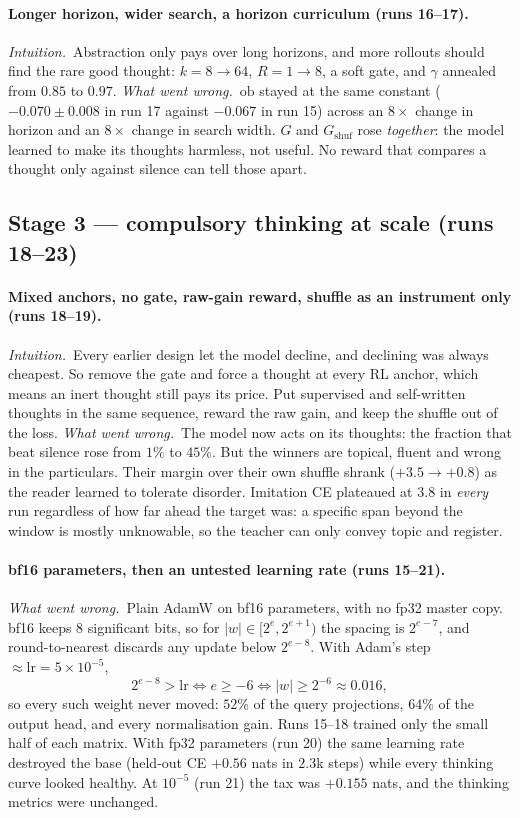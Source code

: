 \documentclass[11pt]{article}
\newcommand{\why}{\emph{Intuition.}\ }
\newcommand{\fail}{\emph{What went wrong.}\ }
\begin{document}
\paragraph{Longer horizon, wider search, a horizon curriculum (runs 16--17).}
\why Abstraction only pays over long horizons, and more rollouts should find the rare good thought: $k=8\to64$, $R=1\to8$, a soft gate, and $\gamma$ annealed from $0.85$ to $0.97$.
\fail $\mathrm{ob}$ stayed at the same constant ($-0.070\pm0.008$ in run 17 against $-0.067$ in run 15) across an $8\times$ change in horizon and an $8\times$ change in search width. $G$ and $G_{\mathrm{shuf}}$ rose \emph{together}: the model learned to make its thoughts harmless, not useful. No reward that compares a thought only against silence can tell those apart.

\subsection*{Stage 3 --- compulsory thinking at scale (runs 18--23)}

\paragraph{Mixed anchors, no gate, raw-gain reward, shuffle as an instrument only (runs 18--19).}
\why Every earlier design let the model decline, and declining was always cheapest. So remove the gate and force a thought at every RL anchor, which means an inert thought still pays its price. Put supervised and self-written thoughts in the same sequence, reward the raw gain, and keep the shuffle out of the loss.
\fail The model now acts on its thoughts: the fraction that beat silence rose from $1\%$ to $45\%$. But the winners are topical, fluent and wrong in the particulars. Their margin over their own shuffle shrank ($+3.5\to+0.8$) as the reader learned to tolerate disorder. Imitation CE plateaued at $3.8$ in \emph{every} run regardless of how far ahead the target was: a specific span beyond the window is mostly unknowable, so the teacher can only convey topic and register.

\paragraph{bf16 parameters, then an untested learning rate (runs 15--21).}
\fail Plain AdamW on bf16 parameters, with no fp32 master copy. bf16 keeps 8 significant bits, so for $|w|\in[2^e,2^{e+1})$ the spacing is $2^{e-7}$, and round-to-nearest discards any update below $2^{e-8}$. With Adam's step $\approx\mathrm{lr}=5\times10^{-5}$,
\[
2^{e-8}>\mathrm{lr}\iff e\ge-6\iff |w|\ge 2^{-6}\approx0.016 ,
\]
so every such weight never moved: $52\%$ of the query projections, $64\%$ of the output head, and every normalisation gain. Runs 15--18 trained only the small half of each matrix. With fp32 parameters (run 20) the same learning rate destroyed the base (held-out CE $+0.56$ nats in $2.3$k steps) while every thinking curve looked healthy. At $10^{-5}$ (run 21) the tax was $+0.155$ nats, and the thinking metrics were unchanged.
\end{document}
